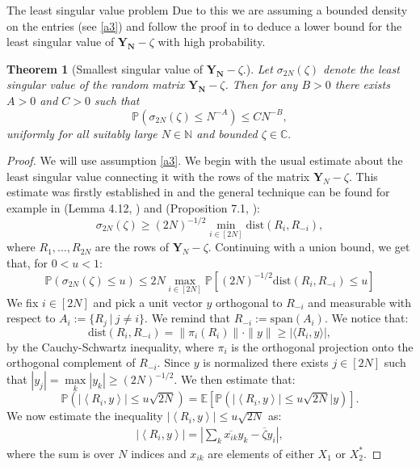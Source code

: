\documentclass[11pt, a4paper, oneside]{book}
\numberwithin{equation}{chapter}
\newtheorem{thm}{Theorem}[section]
\begin{document}
\begin{section}{The least singular value problem}
Due to this we are assuming a bounded density on the entries (see \ref{a3}) and follow the proof in \cite{alt2021inhomogeneous} to deduce a lower bound for the least singular value of $\mathbf{Y_N} - \zeta$ with high probability.
%
%
\begin{thm}[Smallest singular value of $\mathbf{Y_N} - \zeta.$] \label{sv}
 Let $\sigma_{2N}(\zeta)$ denote the least singular value of the random matrix $\mathbf{Y_N} - \zeta$. Then for any $B>0$ there exists $A>0$ and $C>0$ such that
\[
\mathbb{P} \left ( \sigma_{2N}(\zeta) \leq N^{-A} \right ) \leq C N^{-B},
\]
uniformly for all suitably large $N \in \mathbb{N}$ and bounded $\zeta \in \mathbb{C}.$
\end{thm}
%
\begin{proof}
    We will use assumption \ref{a3}. We begin with the usual estimate about the least singular value connecting it with the rows of the matrix $\mathbf{Y}_N - \zeta$. This estimate was firstly established in \cite{rudelson2008littlewood} and the general technique can be found for example in (Lemma 4.12,  \cite{bordenave2012around}) and (Proposition 7.1, \cite{alt2021inhomogeneous}):
    \[
    \sigma_{2N}(\zeta) \geq (2N)^{-1/2} \min_{i \in [2N]} \mathrm{dist}(R_i, R_{-i}),
    \]
    where $R_1,...,R_{2N}$ are the rows of $\mathbf{Y}_N - \zeta$. Continuing with a union bound, we get that, for $0<u<1$:
    \begin{equation} \label{union}
    \mathbb{P}(\sigma_{2N}(\zeta) \leq u) \leq 2N \max_{i \in [2N]} \mathbb{P}[(2N)^{-1/2} \mathrm{dist} (R_i, R_{-i}) \leq u ]
    \end{equation}
    We fix $i \in [2N]$ and pick a unit vector $y$ orthogonal to $R_{-i}$ and measurable with respect to $A_i:=\{ R_j \ | \ j \neq i \}.$ We remind that $R_{-i}:= \mathrm{span}({A_i}).$
    We notice that:
    \[
    \mathrm{dist}(R_i,R_{-i}) = \| \pi_i(R_i)\| \cdot \|y\| \geq |\langle R_i,y \rangle|,
    \]
    by the Cauchy-Schwartz inequality, where $\pi_i$ is the orthogonal projection onto the orthogonal complement of $R_{-i}.$ Since $y$ is normalized there exists $j\in [2N]$ such that $|y_j| = \max \limits_k |y_k| \geq (2N)^{-1/2}$. We then estimate that:
    \begin{equation} \label{expect-prob}
    \mathbb{P}\left(\left|\left\langle R_i, y\right\rangle\right| \leq u \sqrt{2N} \right) =\mathbb{E}\left [ \mathbb{P}\left(\left|\left\langle R_i, y\right\rangle \right| \leq u \sqrt{2N} \bigg | y \right )  \right].
    \end{equation}
    We now estimate the inequality $\left|\left\langle R_i, y\right\rangle\right| \leq u \sqrt{2N}$ as:
    \begin{align*}
        \left|\left\langle R_i, y\right\rangle\right| = \left | \sum \limits_{k} \overline{x_{ik}} y_k - \overline{\zeta}y_i  \right |,
    \end{align*}
     where the sum is over $N$ indices and $x_{ik}$ are elements of either $X_1$ or $X_2^*.$  
     

\end{proof}
\end{section}
\end{document}
